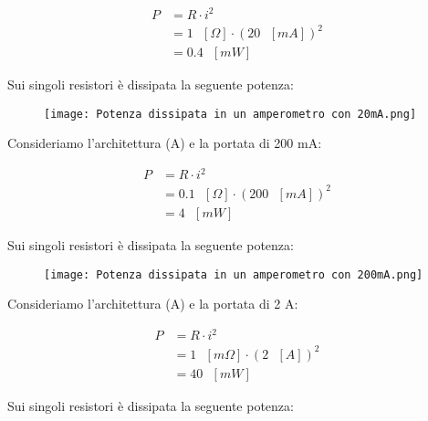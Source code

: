 {
    \Large
    \begin{equation}
        \begin{split}
            P &= R \cdot i^{2}
            \\
            &= 1 \text{ }[\Omega] \cdot (20 \text{ } [mA])^{2}
            \\
            &= 
            0.4 \text{ }[mW] 
        \end{split}
    \end{equation}
}

Sui singoli resistori è dissipata la seguente potenza: 

\begin{figure}[h]
    \centering
    \texttt{[image: Potenza dissipata in un amperometro con 20mA.png]}
\end{figure}

Consideriamo l'architettura (A) e la portata di 200 mA:

{
    \Large
    \begin{equation}
        \begin{split}
            P &= R \cdot i^{2}
            \\
            &= 0.1 \text{ }[\Omega] \cdot (200 \text{ } [mA])^{2}
            \\
            &= 
            4 \text{ }[mW] 
        \end{split}
    \end{equation}
}

\newpage 

Sui singoli resistori è dissipata la seguente potenza: 

\begin{figure}[h]
    \centering
    \texttt{[image: Potenza dissipata in un amperometro con 200mA.png]}
\end{figure}

Consideriamo l'architettura (A) e la portata di 2 A:

{
    \Large
    \begin{equation}
        \begin{split}
            P &= R \cdot i^{2}
            \\
            &= 1 \text{ }[m\Omega] \cdot (2 \text{ } [A])^{2}
            \\
            &= 
            40 \text{ }[mW] 
        \end{split}
    \end{equation}
}

Sui singoli resistori è dissipata la seguente potenza: 

